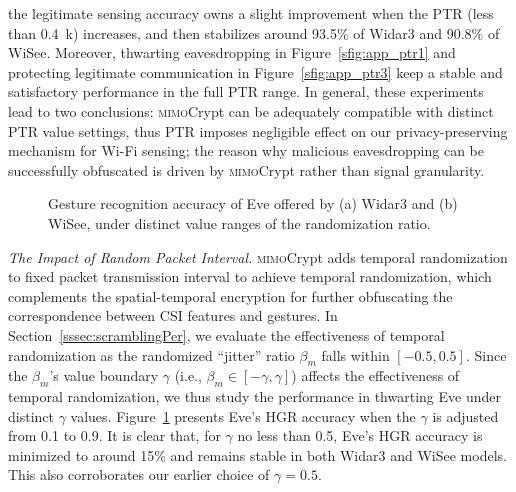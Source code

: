 \documentclass[conference,compsoc]{IEEEtran}
\newcommand{\sname}{\textsc{mimo}Crypt\xspace}
\begin{document}
%
the legitimate sensing accuracy owns a slight improvement when the PTR (less than 0.4~\!k) increases, and then stabilizes around 93.5\% of Widar3 and 90.8\% of WiSee. Moreover, thwarting eavesdropping in Figure~\ref{sfig:app_ptr1} and protecting legitimate communication in Figure~\ref{sfig:app_ptr3} keep a stable and satisfactory performance in the full PTR range. In general, these experiments lead to two conclusions: \sname can be adequately compatible with distinct PTR value settings, thus PTR imposes negligible effect on our privacy-preserving mechanism for Wi-Fi sensing; the reason why malicious eavesdropping can be successfully obfuscated is driven by \sname rather than signal granularity.

\begin{figure}[b]
	\setlength\abovecaptionskip{8pt}
	\vspace{-2.5ex}
	\centering
        \hfill
        \vspace{-.5ex}
	\caption{Gesture recognition accuracy of Eve offered by (a) Widar3 and (b) WiSee, under distinct value ranges of the randomization ratio.}
	\label{fig:packetInterAll}
	\vspace{-.5ex}
\end{figure}

\vspace{1ex}
\noindent\emph{The Impact of Random Packet Interval.}
%
\sname adds temporal randomization to fixed packet transmission interval to achieve temporal randomization, which complements the spatial-temporal encryption for further obfuscating the correspondence between CSI features and gestures. In Section~\ref{sssec:scramblingPer}, we evaluate the effectiveness of temporal randomization as the randomized ``jitter'' ratio $\beta_m$ falls within $\left[ -0.5, 0.5 \right]$. Since the $\beta_m$'s value boundary $\gamma$ (i.e., $\beta_m \in \left[-\gamma, \gamma \right]$) affects the effectiveness of temporal randomization, we thus study the performance in thwarting Eve under distinct $\gamma$ values. Figure~\ref{fig:packetInterAll} presents Eve's HGR accuracy when the $\gamma$ is adjusted from 0.1 to 0.9. It is clear that, for $\gamma$ no less than 0.5, Eve's HGR accuracy is minimized to around 15\% and remains stable in both Widar3 and WiSee models. 
This also corroborates our earlier choice of $\gamma = 0.5$.
\end{document}
